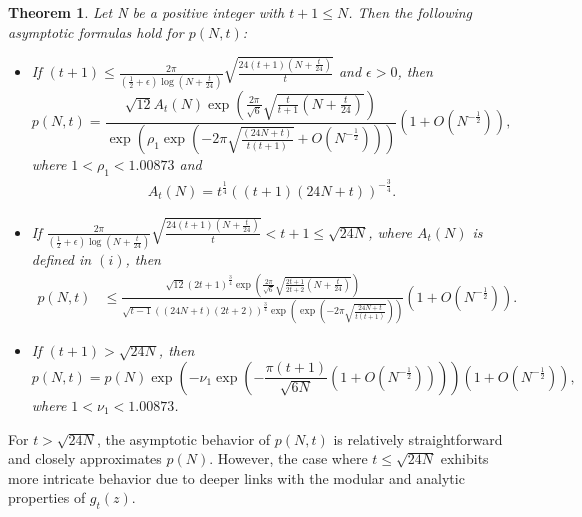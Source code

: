 \documentclass[11pt]{amsart}
\theoremstyle{plain}
\newtheorem{theorem}{Theorem}[section]
\newtheorem{remark}[]{Remark}
\numberwithin{equation}{section}
\begin{document}
	\begin{theorem}\label{theorem-1.2}
		Let N be a positive integer with $t+1\le N$. Then the following asymptotic formulas hold for $p(N,t)$:
		\begin{itemize}
			\item[\hypertarget{thm1.2i}{$(i)$}] If $(t + 1)\le \frac{2\pi}{(\frac{1}{2}+\epsilon)\log \left(N+\frac{t}{24}\right)}\sqrt{\frac{24(t+1)\left(N+\frac{t}{24}\right)}{t}} $ and $\epsilon>0$, then 
			\begin{equation*}
				p(N,t) =\frac{\sqrt{12}A_{t}(N)\exp\left(\frac{2\pi}{\sqrt{6}}\sqrt{\frac{t}{t+1}\left(N+\frac{t}{24}\right)}\right)}{\exp\left(\rho_1\exp\left(-2\pi\sqrt{\frac{(24N+t)}{t(t+1)}}+O\left(N^{-\frac{1}{2}}\right)\right)\right)}\left(1+O\left(N^{-\frac{1}{2}}\right)\right),
			\end{equation*}
			where $1 < \rho_{1} < 1.00873$ and 
			\begin{align*}
				A_{t}(N)=t^{\frac{1}{4}} \left((t+1)(24N+t)\right)^{-\frac{3}{4}}.
			\end{align*}
			\item[\hypertarget{thm1.2ii}{($ii$)}]
			If $\frac{2\pi}{(\frac{1}{2}+\epsilon)\log \left(N+\frac{t}{24}\right)}\sqrt{\frac{24(t+1)\left(N+\frac{t}{24}\right)}{t}}<t+1\le\sqrt{24N}$, where $A_t(N)$ is defined in $(i)$, then
			\begin{align*}
				p(N,t)&\le \frac{\sqrt{12}(2t+1)^{\frac{3}{4}}\exp\left(\frac{2\pi}{\sqrt{6}}\sqrt{\frac{2t+1}{2t+2}\left(N+\frac{t}{24}\right)}\right)}{\sqrt{t-1}\left((24N+t)(2t+2)\right)^{\frac{3}{4}}\exp\left(\exp\left(-2\pi\sqrt{\frac{24N+t}{t(t+1)}}\right)\right)}\left(1+O\left(N^{-\frac{1}{2}}\right)\right). 
			\end{align*}
			\item[\hypertarget{thm1.2iii}{($iii$)}] If $(t + 1) > \sqrt{24N}$, then 
			\begin{equation*}
				p(N,t)=p(N)\exp\left(-\nu_1\exp\left(-\frac{\pi (t+1)}{\sqrt{6N}}\left(1+O\left(N^{-\frac{1}{2}}\right)\right)\right)\right)\left(1+O\left(N^{-\frac{1}{2}}\right)\right),
			\end{equation*}
			where $1 < \nu_{1} < 1.00873$. %
		\end{itemize}
	\end{theorem}
	For $t > \sqrt{24N}$, the asymptotic behavior of $p(N,t)$ is relatively straightforward and closely approximates $p(N)$. However, the case where $t \le \sqrt{24N}$ exhibits more intricate behavior due to deeper links with the modular and analytic properties of $g_t(z)$.
	
\end{document}
